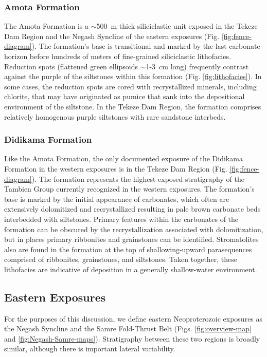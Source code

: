 \subsubsection{Amota Formation}

The Amota Formation is a $\sim$500~m thick siliciclastic unit exposed in the Tekeze Dam Region and the Negash Syncline of the eastern exposures (Fig. \ref{fig:fence-diagram}). The formation's base is transitional and marked by the last carbonate horizon before hundreds of meters of fine-grained siliciclastic lithofacies. Reduction spots (flattened green ellipsoids $\sim$1-3~cm long) frequently contrast against the purple of the siltstones within this formation (Fig. \ref{fig:lithofacies}). In some cases, the reduction spots are cored with recrystallized minerals, including chlorite, that may have originated as pumice that sank into the depositional environment of the siltstone. In the Tekeze Dam Region, the formation comprises relatively homogenous purple siltstones with rare sandstone interbeds.

\subsubsection{Didikama Formation}

Like the Amota Formation, the only documented exposure of the Didikama Formation in the western exposures is in the Tekeze Dam Region (Fig. \ref{fig:fence-diagram}). The formation represents the highest exposed stratigraphy of the Tambien Group currently recognized in the western exposures. The formation's base is marked by the initial appearance of carbonates, which often are extensively dolomitized and recrystallized resulting in pale brown carbonate beds interbedded with siltstones. Primary features within the carbonates of the formation can be obscured by the recrystallization associated with dolomitization, but in places primary ribbonites and grainstones can be identified. Stromatolites also are found in the formation at the top of shallowing-upward parasequences comprised of ribbonites, grainstones, and siltstones. Taken together, these lithofacies are indicative of deposition in a generally shallow-water environment.

\subsection{Eastern Exposures}

For the purposes of this discussion, we define eastern Neoproterozoic exposures as the Negash Syncline and the Samre Fold-Thrust Belt (Figs. \ref{fig:overview-map} and \ref{fig:Negash-Samre-maps}). Stratigraphy between these two regions is broadly similar, although there is important lateral variability.

